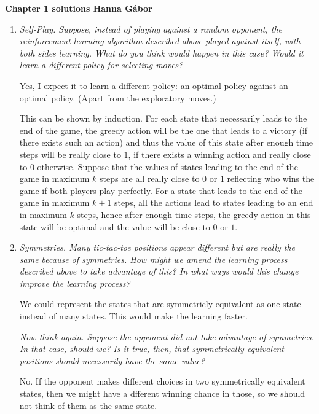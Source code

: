 \documentclass[12pt,a4paper]{article}
\begin{document}
\textbf{Chapter 1 solutions  \hfill Hanna Gábor}\\

\begin{enumerate}
  \item
    \textit{
      Self-Play. Suppose, instead of playing against a random opponent, the reinforcement learning algorithm described above played against itself, with both sides learning. What do you think would happen in this case? Would it learn a different policy for selecting moves?}

    Yes, I expect it to learn a different policy: an optimal policy against an optimal policy. (Apart from the exploratory moves.)

    This can be shown by induction. For each state that necessarily leads to the end of the game, the greedy action will be the one that leads to a victory (if there exists such an action) and thus the value of this state after enough time steps will be really close to $1$, if there exists a winning action and really close to $0$ otherwise. Suppose that the values of states leading to the end of the game in maximum $k$ steps are all really close to $0$ or $1$ reflecting who wins the game if both players play perfectly. For a state that leads to the end of the game in maximum $k + 1$ steps, all the actions lead to states leading to an end in maximum $k$ steps, hence after enough time steps, the greedy action in this state will be optimal and the value will be close to $0$ or $1$.

   \item
     \textit{
       Symmetries. Many tic-tac-toe positions appear different but are really the same because of symmetries. How might we amend the learning process described above to take advantage of this? In what ways would this change improve the learning process?}

     We could represent the states that are symmetricly equivalent as one state instead of many states. This would make the learning faster.

     \textit{
       Now think again. Suppose the opponent did not take advantage of symmetries. In that case, should we? Is it true, then, that symmetrically equivalent positions should necessarily have the same value?}

      No. If the opponent makes different choices in two symmetrically equivalent states, then we might have a dfferent winning chance in those, so we should not think of them as the same state.


\end{enumerate}
\end{document}
